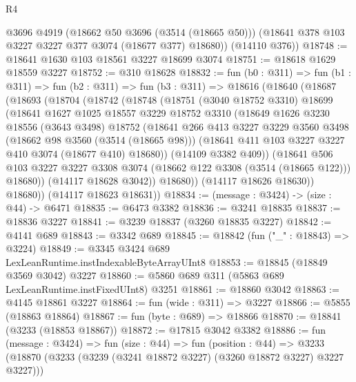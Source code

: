 \begin{lexlean}{R4}
\begin{coremodule}
        @3696
        @4919
        (@18662 @50 @3696 (@3514 (@18665 @50)))
        (@18641 @378 @103 @3227 @3227 @377 @3074 (@18677 @377) @18680))
      (@14110 @376))
@18748 := @18641 @1630 @103 @18561 @3227 @18699 @3074
@18751 := @18618 @1629 @18559 @3227
@18752 := @310 @18628
@18832 := fun (b0 : @311) =>
  fun (b1 : @311) =>
  fun (b2 : @311) =>
  fun (b3 : @311) =>
  @18616
    (@18640
      (@18687
        (@18693
          (@18704
            (@18742
              (@18748
                (@18751
                  (@3040 @18752 @3310)
                  @18699
                  (@18641
                    @1627
                    @1025
                    @18557
                    @3229
                    @18752
                    @3310
                    (@18649
                      @1626
                      @3230
                      @18556
                      (@3643 @3498)
                      @18752
                      (@18641
                        @266
                        @413
                        @3227
                        @3229
                        @3560
                        @3498
                        (@18662 @98 @3560 (@3514 (@18665 @98)))
                        (@18641 @411 @103 @3227 @3227 @410 @3074 (@18677 @410) @18680))
                      (@14109 @3382 @409))
                    (@18641
                      @506
                      @103
                      @3227
                      @3227
                      @3308
                      @3074
                      (@18662 @122 @3308 (@3514 (@18665 @122)))
                      @18680))
                  (@14117 @18628 @3042))
                @18680))
            (@14117 @18626 @18630))
          @18680))
      (@14117 @18623 @18631))
@18834 := (message : @3424) -> (size : @44) -> @6471
@18835 := @6473 @3382
@18836 := @3241 @18835
@18837 := @18836 @3227
@18841 := @3239 @18837 (@3260 @18835 @3227)
@18842 := @4141 @689
@18843 := @3342 @689
@18845 := @18842 (fun ("_" : @18843) => @3224)
@18849 := @3345 @3424 @689 LexLeanRuntime.instIndexableByteArrayUInt8
@18853 := @18845 (@18849 @3569 @3042) @3227
@18860 := @5860 @689 @311 (@5863 @689 LexLeanRuntime.instFixedUInt8) @3251
@18861 := @18860 @3042
@18863 := @4145 @18861 @3227
@18864 := fun (wide : @311) => @3227
@18866 := @5855 (@18863 @18864)
@18867 := fun (byte : @689) => @18866
@18870 := @18841 (@3233 (@18853 @18867))
@18872 := @17815 @3042 @3382
@18886 := fun (message : @3424) =>
  fun (size : @44) =>
  fun (position : @44) =>
  @3233 (@18870 (@3233 (@3239 (@3241 @18872 @3227) (@3260 @18872 @3227) @3227 @3227)))

\end{coremodule}
\end{lexlean}
